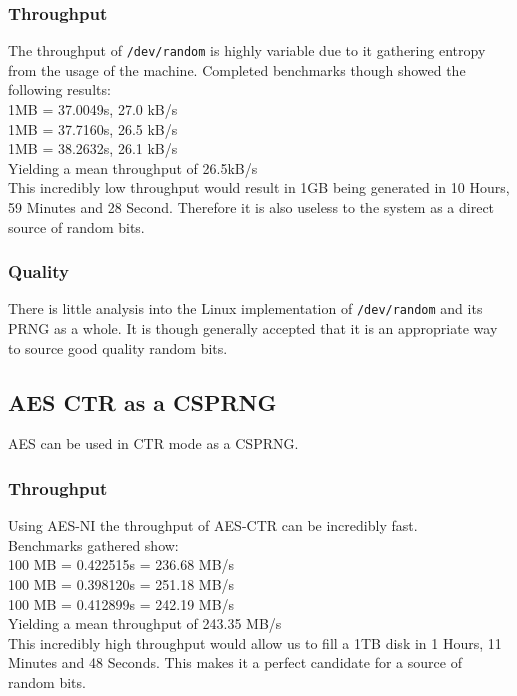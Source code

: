 \documentclass{paper}
\begin{document}
			\subsubsection{Throughput}
				The throughput of \texttt{/dev/random} is highly variable due to it gathering entropy from the usage of the machine. Completed benchmarks though showed the following results:\\	
				1MB = 37.0049s, 27.0 kB/s\\
				1MB = 37.7160s, 26.5 kB/s\\
				1MB = 38.2632s, 26.1 kB/s\\
				Yielding a mean throughput of 26.5kB/s\\
				
				This incredibly low throughput would result in 1GB being generated in 10 Hours, 59 Minutes and 28 Second. Therefore it is also useless to the system as a direct source of random bits.\\
			\subsubsection{Quality}
				There is little analysis into the Linux implementation of  \texttt{/dev/random} and its PRNG as a whole. It is though generally accepted that it is an appropriate way to source good quality random bits.\\
			
		\subsection{AES CTR as a CSPRNG}
			AES can be used in CTR mode as a CSPRNG.\\
			\subsubsection{Throughput}
				Using AES-NI the throughput of AES-CTR can be incredibly fast.\\
				Benchmarks gathered show:\\
				100 MB = 0.422515s = 236.68 MB/s\\
				100 MB = 0.398120s = 251.18 MB/s\\
				100 MB = 0.412899s = 242.19 MB/s\\
				Yielding a mean throughput of 243.35 MB/s\\
				
				This incredibly high throughput would allow us to fill a 1TB disk in 1 Hours, 11 Minutes and 48 Seconds. This makes it a perfect candidate for a source of random bits.\\
\end{document}
